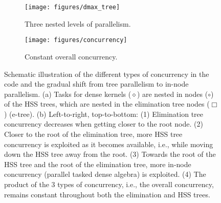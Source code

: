 \documentclass{article}
\begin{document}
\begin{figure}
  \begin{subfigure}[b]{.49\textwidth}
    \texttt{[image: figures/dmax\_tree]}
    \vspace{.2cm}
    \caption{Three nested levels of parallelism.}
    \label{fig:dmax_tree}
  \end{subfigure}
  \begin{subfigure}[b]{.49\textwidth}
    \centering
    \texttt{[image: figures/concurrency]}
    \caption{Constant overall concurrency.}
    \label{fig:concurrency}
  \end{subfigure}
  \caption{\footnotesize Schematic illustration of the different types
    of concurrency in the code and the gradual shift from tree
    parallelism to in-node parallelism. (a) Tasks for dense kernels
    ($\diamond$) are nested in nodes ($\circ$) of the HSS trees, which
    are nested in the elimination tree nodes ($\Box$) (e-tree). (b)
    Left-to-right, top-to-bottom: (1) Elimination tree concurrency
    decreases when getting closer to the root node. (2) Closer to the
    root of the elimination tree, more HSS tree concurrency is
    exploited as it becomes available, i.e., while moving down the HSS
    tree away from the root. (3) Towards the root of the HSS tree and
    the root of the elimination tree, more in-node concurrency
    (parallel tasked dense algebra) is exploited. (4) The product of
    the 3 types of concurrency, i.e., the overall concurrency, remains
    constant throughout both the elimination and HSS trees.}
  \label{fig:conc}
\end{figure}
\end{document}
